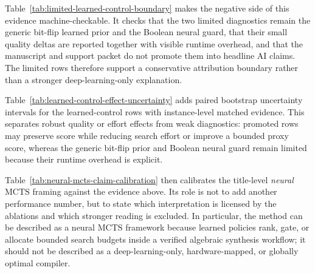 \documentclass[11pt]{article}
\newcommand{\mcts}{\ensuremath{\mathrm{MCTS}}}
\begin{document}
Table~\ref{tab:limited-learned-control-boundary} makes the negative side of
this evidence machine-checkable.  It checks that the two limited diagnostics
remain the generic bit-flip learned prior and the Boolean neural guard, that
their small quality deltas are reported together with visible runtime overhead,
and that the manuscript and support packet do not promote them into headline
AI claims.  The limited rows therefore support a conservative attribution
boundary rather than a stronger deep-learning-only explanation.

\begin{table}[H]
\centering
\scriptsize
\setlength{\tabcolsep}{2pt}
\renewcommand{\arraystretch}{1.02}
\caption{Limited learned-control boundary audit.  The table checks that weak
or runtime-negative learned diagnostics remain visible as limitations and are
not promoted as headline neural/\mcts{} evidence.}
\label{tab:limited-learned-control-boundary}

\end{table}

Table~\ref{tab:learned-control-effect-uncertainty} adds paired bootstrap
uncertainty intervals for the learned-control rows with instance-level matched
evidence.  This separates robust quality or effort effects from weak
diagnostics: promoted rows may preserve score while reducing search effort or
improve a bounded proxy score, whereas the generic bit-flip prior and Boolean
neural guard remain limited because their runtime overhead is explicit.

\begin{table}[H]
\centering
\tiny
\setlength{\tabcolsep}{2pt}
\renewcommand{\arraystretch}{0.94}
\caption{Learned-control effect-uncertainty audit.  Negative score changes
favor the learned or gated target; effort deltas refer to planning time,
runtime, or exact candidate evaluations depending on the row.}
\label{tab:learned-control-effect-uncertainty}

\end{table}

Table~\ref{tab:neural-mcts-claim-calibration} then calibrates the
title-level \emph{neural \mcts{}} framing against the evidence above.  Its role
is not to add another performance number, but to state which interpretation is
licensed by the ablations and which stronger reading is excluded.  In
particular, the method can be described as a neural \mcts{} framework because
learned policies rank, gate, or allocate bounded search budgets inside a
verified algebraic synthesis workflow; it should not be described as a
deep-learning-only, hardware-mapped, or globally optimal compiler.
\end{document}
